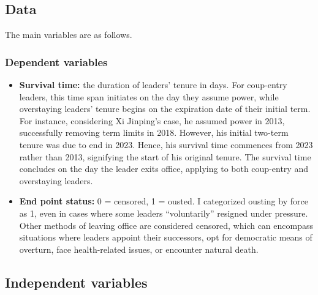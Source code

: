 \documentclass[
  12pt,
  a4paper,
  12pt]{article}
\begin{document}
\subsection{Data}\label{data}

The main variables are as follows.

\subsubsection{Dependent variables}\label{dependent-variables}

\begin{itemize}
\item
  \textbf{Survival time:} the duration of leaders' tenure in days. For
  coup-entry leaders, this time span initiates on the day they assume
  power, while overstaying leaders' tenure begins on the expiration date
  of their initial term. For instance, considering Xi Jinping's case, he
  assumed power in 2013, successfully removing term limits in 2018.
  However, his initial two-term tenure was due to end in 2023. Hence,
  his survival time commences from 2023 rather than 2013, signifying the
  start of his original tenure. The survival time concludes on the day
  the leader exits office, applying to both coup-entry and overstaying
  leaders.
\item
  \textbf{End point status:} 0 = censored, 1 = ousted. I categorized
  ousting by force as 1, even in cases where some leaders
  ``voluntarily'' resigned under pressure. Other methods of leaving
  office are considered censored, which can encompass situations where
  leaders appoint their successors, opt for democratic means of
  overturn, face health-related issues, or encounter natural death.
\end{itemize}

\subsection{Independent variables}\label{independent-variables}
\end{document}
